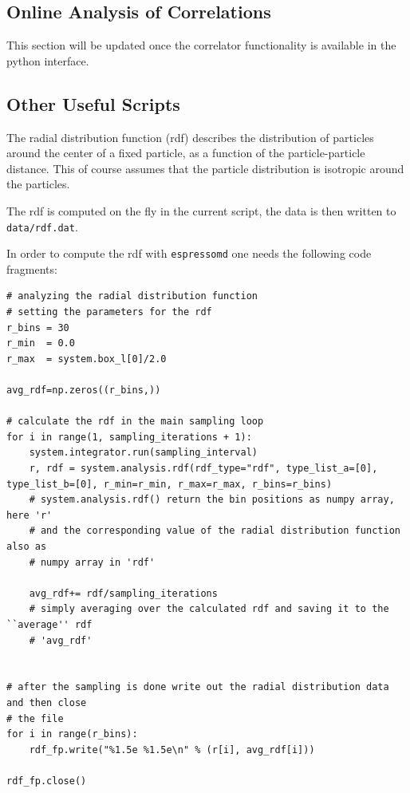 \documentclass[
paper=a4,                       %
fontsize=11pt,                  %
twoside,                        %
footsepline,                    %
headsepline,                    %
headinclude=false,              %
footinclude=false,              %
pagesize,                       %
]{scrartcl}
\begin{document}
\newpage


\subsection{Online Analysis of Correlations}

\label{subsection:online_analysis}

This section will be updated once the correlator functionality is available in the
python interface.


\subsection{Other Useful Scripts}

\label{subsection:other_useful_scripts}
The radial distribution function (rdf) describes the distribution of particles around
the center of a fixed particle, as a function of the particle-particle distance. This of course assumes
that the particle distribution is isotropic around the particles.

The rdf is computed on the fly in the current script, the data is then written to
\texttt{data/rdf.dat}.

In order to compute the rdf with \texttt{espressomd} one needs the following code
fragments:
\begin{lstlisting}
# analyzing the radial distribution function
# setting the parameters for the rdf
r_bins = 30
r_min  = 0.0
r_max  = system.box_l[0]/2.0

avg_rdf=np.zeros((r_bins,))

# calculate the rdf in the main sampling loop
for i in range(1, sampling_iterations + 1):
    system.integrator.run(sampling_interval)
    r, rdf = system.analysis.rdf(rdf_type="rdf", type_list_a=[0], type_list_b=[0], r_min=r_min, r_max=r_max, r_bins=r_bins)
    # system.analysis.rdf() return the bin positions as numpy array, here 'r'
    # and the corresponding value of the radial distribution function also as
    # numpy array in 'rdf'

    avg_rdf+= rdf/sampling_iterations
    # simply averaging over the calculated rdf and saving it to the ``average'' rdf
    # 'avg_rdf'
    

# after the sampling is done write out the radial distribution data and then close
# the file
for i in range(r_bins):
    rdf_fp.write("%1.5e %1.5e\n" % (r[i], avg_rdf[i]))

rdf_fp.close()
\end{lstlisting}
\end{document}
